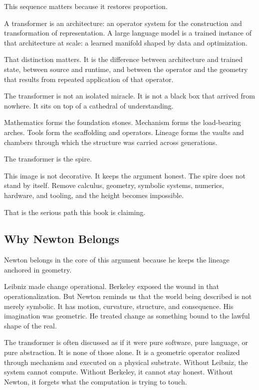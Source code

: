 \documentclass[
]{article}
\begin{document}
This sequence matters because it restores proportion.

A transformer is an architecture: an operator system for the
construction and transformation of representation. A large language
model is a trained instance of that architecture at scale: a learned
manifold shaped by data and optimization.

That distinction matters. It is the difference between architecture and
trained state, between source and runtime, and between the operator and
the geometry that results from repeated application of that operator.

The transformer is not an isolated miracle. It is not a black box that
arrived from nowhere. It sits on top of a cathedral of understanding.

Mathematics forms the foundation stones. Mechanism forms the
load-bearing arches. Tools form the scaffolding and operators. Lineage
forms the vaults and chambers through which the structure was carried
across generations.

The transformer is the spire.

This image is not decorative. It keeps the argument honest. The spire
does not stand by itself. Remove calculus, geometry, symbolic systems,
numerics, hardware, and tooling, and the height becomes impossible.

That is the serious path this book is claiming.

\hypertarget{why-newton-belongs}{%
\subsection{Why Newton Belongs}\label{why-newton-belongs}}

Newton belongs in the core of this argument because he keeps the lineage
anchored in geometry.

Leibniz made change operational. Berkeley exposed the wound in that
operationalization. But Newton reminds us that the world being described
is not merely symbolic. It has motion, curvature, structure, and
consequence. His imagination was geometric. He treated change as
something bound to the lawful shape of the real.

The transformer is often discussed as if it were pure software, pure
language, or pure abstraction. It is none of those alone. It is a
geometric operator realized through mechanism and executed on a physical
substrate. Without Leibniz, the system cannot compute. Without Berkeley,
it cannot stay honest. Without Newton, it forgets what the computation
is trying to touch.
\end{document}

